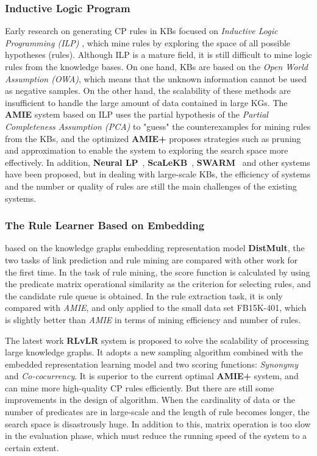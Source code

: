 \documentclass{article}
\begin{document}
	\subsubsection{Inductive Logic Program} 
	Early research on generating CP rules in KBs focused on {\em Inductive Logic Programming (ILP)}  \cite{Muggleton:ILP}, which mine rules by exploring the space of all possible hypotheses (rules). Although ILP is a mature field, it is still difficult to mine logic rules from the knowledge bases. On one hand, KBs are based on the {\em Open World Assumption (OWA)}, which means that the unknown information cannot be used as negative samples. On the other hand, the scalability of these methods are insufficient to handle the large amount of data contained in large KGs. 
	The {\bf AMIE} \cite{Galarraga:AMIE} system based on ILP uses the partial hypothesis of the {\em Partial Completeness Assumption (PCA)} to "guess" the counterexamples for mining rules from the KBs, and the optimized {\bf AMIE+} \cite{Galarraga:AMIE+} proposes strategies such as pruning and approximation to enable the system to exploring the search space more effectively. In addition, {\bf Neural LP}~\cite{Yang:NeuralLP}, {\bf ScaLeKB}~\cite{Chen:ScaLeKB}, {\bf SWARM}~\cite{Molood:SWARM} and other systems have been proposed, but in dealing with large-scale KBs, the efficiency of systems and the number or quality of rules are still the main challenges of the existing systems.
	
	\subsubsection{The Rule Learner Based on Embedding} 
	\cite{Yang:2015} based on the knowledge graphs embedding representation model {\bf DistMult}, the two tasks of link prediction and rule mining are compared with other work for the first time. In the task of rule mining, the score function is calculated by using the predicate matrix operational similarity as the criterion for selecting rules, and the candidate rule queue is obtained. 
	In the rule extraction task, it is only compared with {\em AMIE}, and only applied to the small data set FB15K-401, which is slightly better than {\em AMIE} in terms of mining efficiency and number of rules. 
	
	The latest work {\bf RLvLR} system \cite{Omran:RLvLR} is proposed to solve the scalability of  processing large knowledge graphs. It adopts a new sampling algorithm combined with the embedded representation learning model and two scoring functions: {\em Synonymy} and {\em Co-cocurrency}. 
	It is superior to the current optimal {\bf AMIE+} system, and can mine more high-quality CP rules efficiently. 
	But there are still some improvements in the design of algorithm. When the cardinality of data or the number of predicates are in large-scale and the length of rule becomes longer, the search space is disastrously huge. In addition to this, matrix operation is too slow in the evaluation phase, which must reduce the running speed of the system to a certain extent.
	
\end{document}
